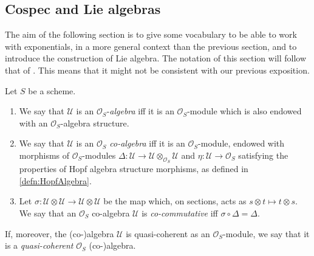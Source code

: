 \subsection{Cospec and Lie algebras}
The aim of the following section is to give some vocabulary to
be able to work with exponentials, in a more general context than the previous section,
and to introduce the construction of Lie algebra.
The notation of this section will follow that of \cite[Capther III]{Messing}.
This means that it might not be consistent with our previous exposition.


\newpage
\begin{defn}
	Let $S$ be a scheme.
\begin{enumerate}
\item We say that $\mathcal{U}$ is an $\mathcal{O}_{ S }$-\emph{algebra}
	iff it is an $\mathcal{O}_{ S }$-module
	which is also endowed with an $\mathcal{O}_{ S }$-algebra structure.

\item We say that $\mathcal{U}$ is an $\mathcal{O}_{ S }$ \emph{co-algebra}
	iff it is an $\mathcal{O}_{ S }$-module, endowed with
	morphisms of $\mathcal{O}_S$-modules
	$\Delta\colon \mathcal{U} \to \mathcal{U} \otimes_{\mathcal{O}_{ S }} \mathcal{U}$
	and $\eta\colon \mathcal{U} \to \mathcal{O}_{ S }$
	satisfying the properties of Hopf algebra structure morphisms,
	as defined in \cref{defn:HopfAlgebra}.
	
\item Let \(\sigma\colon \mathcal{U} \otimes \mathcal{U} \to \mathcal{U} \otimes \mathcal{U}\) be
	the map which, on sections, acts as \(s \otimes t \mapsto t \otimes s\).
	We say that an \(\mathcal{O}_{ S }\) co-algebra \(\mathcal{U}\)
	is \emph{co-commutative} iff \(\sigma \circ \Delta = \Delta\).
\end{enumerate}
	If, moreover, the (co-)algebra $\mathcal{U}$ is quasi-coherent as an $\mathcal{O}_{ S }$-module,
	we say that it is a \emph{quasi-coherent} $\mathcal{O}_{ S }$ \mbox{(co-)}algebra.
\end{defn}


